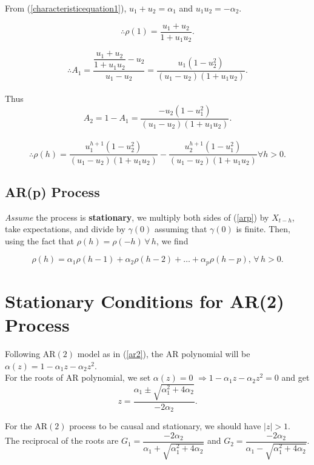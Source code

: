 \documentclass[11pt, a4paper]{article}
\numberwithin{equation}{section}
\theoremstyle{definition}
\begin{document}
From (\ref{characteristicequation1}), $u_1 + u_2 = \alpha_1$ and $u_1 u_2 = -\alpha_2$.

$$\therefore \rho(1) = \dfrac{u_1 + u_2}{1 + u_1 u_2}.$$

$$\therefore A_1 = \dfrac{\dfrac{u_1 + u_2}{1 + u_1 u_2} - u_2}{u_1 - u_2} = \dfrac{u_1 (1 - u_2^2)}{(u_1 - u_2)(1 + u_1 u_2)}.$$\\[0.5em]

Thus
$$A_2 = 1 - A_1 = \dfrac{-u_2 (1 - u_1^2)}{(u_1 - u_2)(1 + u_1 u_2)}.$$\\[0.5em]

$$\therefore \rho(h) = \dfrac{u_1^{h+1} (1 - u_2^2)}{(u_1 - u_2)(1 + u_1 u_2)} - \dfrac{u_2^{h+1} (1 - u_1^2)}{(u_1 - u_2)(1 + u_1 u_2)} \forall h > 0.$$


\subsection{AR(p) Process}

\textit{Assume} the process is \textbf{stationary}, we multiply both sides of (\ref{arp}) by $X_{t-h}$, take expectations, and divide by $\gamma(0)$ assuming that $\gamma(0)$ is finite. Then, using the fact that $\rho(h) = \rho(-h) \, \forall \, h$, we find

\begin{equation}
\rho(h) = \alpha_1 \rho(h-1) + \alpha_2 \rho(h-2) + \ldots + \alpha_p \rho(h-p), \, \forall \, h > 0. 
\end{equation}

\newpage

\section{Stationary Conditions for AR(2) Process}

Following AR$(2)$ model as in (\ref{ar2}), the AR polynomial will be $\alpha(z) = 1 - \alpha_1 z - \alpha_2 z^2$.\\

For the roots of AR polynomial, we set $\alpha(z) = 0$ $\Rightarrow 1 - \alpha_1 z - \alpha_2 z^2 = 0$ and get $$z = \dfrac{\alpha_1 \pm \sqrt{\alpha_1^2 + 4\alpha_2}}{-2\alpha_2}.$$

For the AR$(2)$ process to be causal and stationary, we should have $|z| > 1$.\\[0.5em]

The reciprocal of the roots are $G_1 = \dfrac{-2\alpha_2}{\alpha_1 + \sqrt{\alpha_1^2 + 4\alpha_2}}$ and $G_2 = \dfrac{-2\alpha_2}{\alpha_1 - \sqrt{\alpha_1^2 + 4\alpha_2}}$.\\[0.5em]
\end{document}
